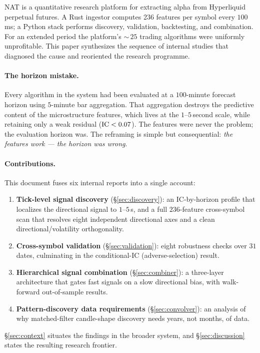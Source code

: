 \documentclass[11pt]{article}
\newcommand{\ic}{\textnormal{IC}}
\begin{document}
NAT is a quantitative research platform for extracting alpha from Hyperliquid perpetual
futures. A Rust ingestor computes 236 features per symbol every $100\,$ms; a Python stack
performs discovery, validation, backtesting, and combination. For an extended period the
platform's $\sim$\,$25$ trading algorithms were uniformly unprofitable. This paper
synthesizes the sequence of internal studies that diagnosed the cause and reoriented the
research programme.

\paragraph{The horizon mistake.}
Every algorithm in the system had been evaluated at a $100$-minute forecast horizon using
$5$-minute bar aggregation. That aggregation destroys the predictive content of the
microstructure features, which lives at the $1$--$5\,$second scale, while retaining only a
weak residual ($\ic < 0.07$). The features were never the problem; the evaluation horizon
was. The reframing is simple but consequential: \emph{the features work --- the horizon
was wrong}.

\paragraph{Contributions.}
This document fuses six internal reports into a single account:
\begin{enumerate}
  \item \textbf{Tick-level signal discovery} (\S\ref{sec:discovery}): an \ic-by-horizon
        profile that localizes the directional signal to $1$--$5\,$s, and a full
        $236$-feature cross-symbol scan that resolves eight independent directional axes
        and a clean directional/volatility orthogonality.
  \item \textbf{Cross-symbol validation} (\S\ref{sec:validation}): eight robustness checks
        over $31$ dates, culminating in the conditional-\ic{} (adverse-selection) result.
  \item \textbf{Hierarchical signal combination} (\S\ref{sec:combiner}): a three-layer
        architecture that gates fast signals on a slow directional bias, with
        walk-forward out-of-sample results.
  \item \textbf{Pattern-discovery data requirements} (\S\ref{sec:convolver}): an analysis
        of why matched-filter candle-shape discovery needs years, not months, of data.
\end{enumerate}
\S\ref{sec:context} situates the findings in the broader system, and \S\ref{sec:discussion}
states the resulting research frontier.
\end{document}
